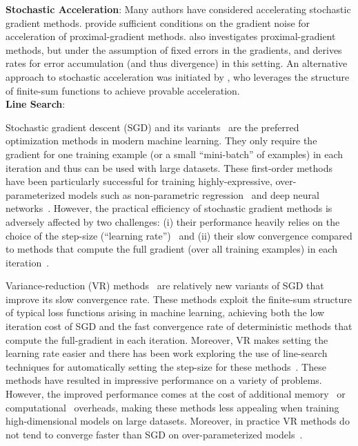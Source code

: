 \noindent \textbf{Stochastic Acceleration}: 
Many authors have considered accelerating stochastic gradient methods.
\citet{schmidt2011convergence} provide sufficient conditions on the gradient noise for acceleration of proximal-gradient methods.
\citet{nesterov2007proximalgradient} also investigates proximal-gradient methods, but under the assumption of fixed errors in the gradients, and derives rates for error accumulation (and thus divergence) in this setting. 
An alternative approach to stochastic acceleration was initiated by \citet{allen-zhu2017katyusha}, who leverages the structure of finite-sum functions to achieve provable acceleration.\\



\noindent \textbf{Line Search}:

\newpage

\iffalse

Stochastic gradient descent (SGD) and its variants~\cite{duchi2011adagrad,zeiler2012adadelta,kingma2015adam,tieleman2012rmsprop,schmidt2017sag,johnson2013svrg,defazio2014saga} are the preferred optimization methods in modern machine learning. They only require the gradient for one training example (or a small ``mini-batch'' of examples) in each iteration and thus can be used with large datasets. These first-order methods have been particularly successful for training highly-expressive, over-parameterized models such as non-parametric regression~\cite{liang2018just,belkin2019does} and deep neural networks~\cite{bengio2012practical,zhang2016understanding}. However, the practical efficiency of stochastic gradient methods is adversely affected by two challenges: (i) their performance heavily relies on the choice of the step-size (``learning rate'')~\cite{bengio2012practical, schaul2013no} and (ii) their slow convergence compared to methods that compute the full gradient (over all training examples) in each iteration~\cite{nesterov2013introductory}. 

Variance-reduction (VR) methods~\cite{schmidt2017minimizing,johnson2013accelerating,defazio2014saga} are relatively new variants of SGD that improve its slow convergence rate. These methods exploit the finite-sum structure of typical loss functions arising in machine learning, achieving both the low iteration cost of SGD and the fast convergence rate of deterministic methods that compute the full-gradient in each iteration. Moreover, VR makes setting the learning rate easier and there has been work exploring the use of line-search techniques for automatically setting the step-size for these methods~\cite{schmidt2017minimizing,schmidt2015non,tan2016barzilai,shang2018guaranteed}. These methods have resulted in impressive performance on a variety of problems. However, the improved performance comes at the cost of additional memory~\cite{schmidt2017minimizing} or computational~\cite{johnson2013accelerating, defazio2014saga} overheads, making these methods less appealing when training high-dimensional models on large datasets. Moreover, in practice VR methods do not tend to converge faster than SGD on over-parameterized models~\cite{defazio2018ineffectiveness}. 

